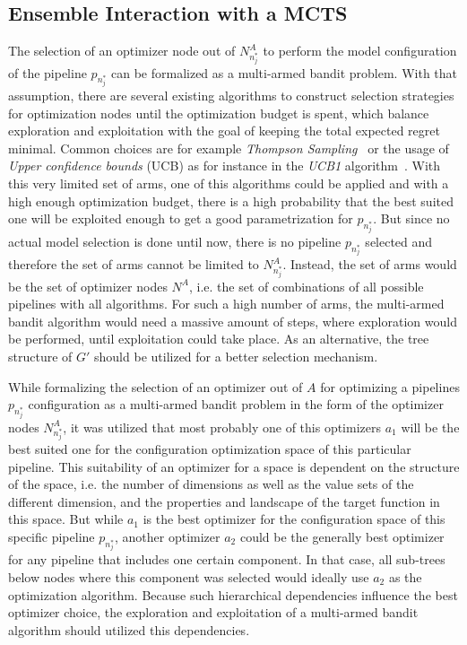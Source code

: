 \subsection{Ensemble Interaction with a MCTS}
\label{sec:appraoch:selection:mcts}
The selection of an optimizer node out of $N^A_{n^*_j}$ to perform the model configuration of the pipeline $p_{n^*_j}$ can be formalized as a multi-armed bandit problem.
With that assumption, there are several existing algorithms to construct selection strategies for optimization nodes until the optimization budget is spent, which balance exploration and exploitation with the goal of keeping the total expected regret minimal.
Common choices are for example \textit{Thompson Sampling}~\cite{Thompson-Sampling} or the usage of \textit{Upper confidence bounds} (UCB) as for instance in the \textit{UCB1} algorithm~\cite{Auer-UCB1}.\newline
With this very limited set of arms, one of this algorithms could be applied and with a high enough optimization budget, there is a high probability that the best suited one will be exploited enough to get a good parametrization for $p_{n^*_j}$.
But since no actual model selection is done until now, there is no pipeline $p_{n^*_j}$ selected and therefore the set of arms cannot be limited to $N^A_{n^*_j}$.
Instead, the set of arms would be the set of optimizer nodes $N^A$, i.e. the set of combinations of all possible pipelines with all algorithms.\newline
For such a high number of arms, the multi-armed bandit algorithm would need a massive amount of steps, where exploration would be performed, until exploitation could take place.
As an alternative, the tree structure of $G'$ should be utilized for a better selection mechanism.

While formalizing the selection of an optimizer out of $A$ for optimizing a pipelines $p_{n^*_j}$ configuration as a multi-armed bandit problem in the form of the optimizer nodes $N^A_{n^*_j}$, it was utilized that most probably one of this optimizers $a_1$ will be the best suited one for the configuration optimization space of this particular pipeline.
This suitability of an optimizer for a space is dependent on the structure of the space, i.e. the number of dimensions as well as the value sets of the different dimension, and the properties and landscape of the target function in this space.\newline
But while $a_1$ is the best optimizer for the configuration space of this specific pipeline $p_{n^*_j}$, another optimizer $a_2$ could be the generally best optimizer for any pipeline that includes one certain component.
In that case, all sub-trees below nodes where this component was selected would ideally use $a_2$ as the optimization algorithm.
Because such hierarchical dependencies influence the best optimizer choice, the exploration and exploitation of a multi-armed bandit algorithm should utilized this dependencies.

